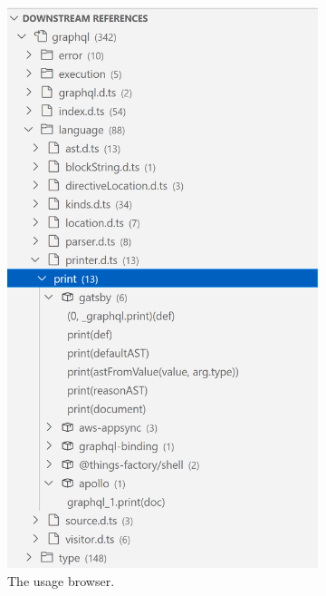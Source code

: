 \begin{figure}[b]
\begin{subfigure}{.32\linewidth}
		\includegraphics[width=\textwidth]{sections/6_implementation/extension/references.png}
		\caption[LoF entry]{The usage browser.}
	\end{subfigure}
	\hfill
	\begin{subfigure}{.32\linewidth}

\end{subfigure}
\end{figure}
